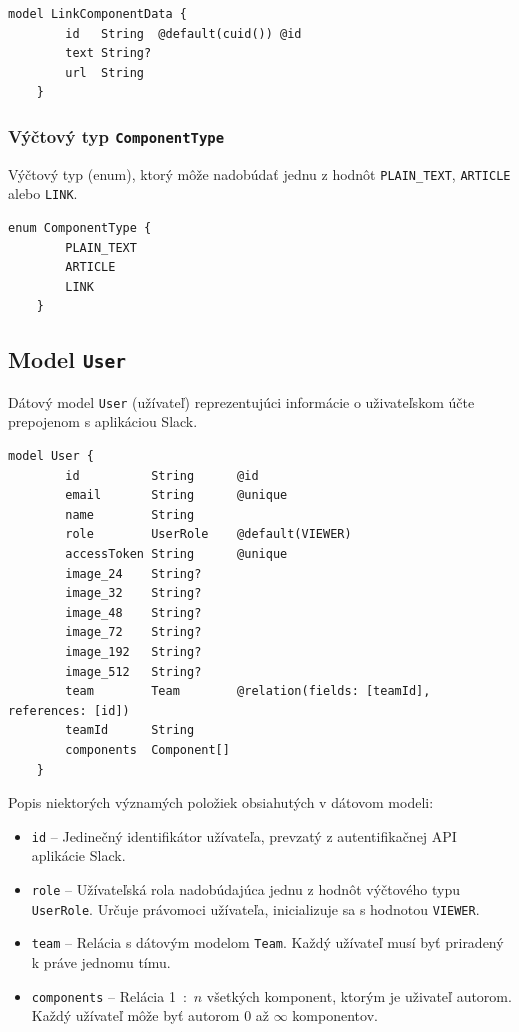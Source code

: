 \begin{lstlisting}[caption=Dátový model \texttt{LinkComponentData} v konfiguračnom súbore \texttt{prisma}.]
	model LinkComponentData {
		id   String  @default(cuid()) @id
		text String?
		url  String
	}
\end{lstlisting}

\subsubsection{Výčtový typ \texttt{ComponentType}}
Výčtový typ (enum), ktorý môže nadobúdať jednu z hodnôt \texttt{PLAIN\_TEXT}, \texttt{ARTICLE} alebo \texttt{LINK}. \\

\begin{lstlisting}[caption=Výčtový typ \texttt{ComponentType} v konfiguračnom súbore \texttt{prisma}.]
	enum ComponentType {
		PLAIN_TEXT
		ARTICLE
		LINK
	}
\end{lstlisting}

\subsection{Model \texttt{User}}
Dátový model \texttt{User} (užívateľ) reprezentujúci informácie o uživateľskom účte prepojenom s aplikáciou Slack. \\

\begin{lstlisting}[caption=Dátový model \texttt{User} v konfiguračnom súbore \texttt{prisma}.]
	model User {
		id          String      @id
		email       String      @unique
		name        String
		role        UserRole    @default(VIEWER)
		accessToken String      @unique
		image_24    String?
		image_32    String?
		image_48    String?
		image_72    String?
		image_192   String?
		image_512   String?
		team        Team        @relation(fields: [teamId], references: [id])
		teamId      String
		components  Component[]
	}
\end{lstlisting}

\bigskip

\noindent Popis niektorých významých položiek obsiahutých v dátovom modeli:

\begin{itemize}
	\item \texttt{id} -- Jedinečný identifikátor užívateľa, prevzatý z autentifikačnej API aplikácie Slack.
	\item \texttt{role} -- Užívateľská rola nadobúdajúca jednu z hodnôt výčtového typu \texttt{UserRole}. Určuje právomoci užívateľa, inicializuje sa s hodnotou \texttt{VIEWER}.
	\item \texttt{team} -- Relácia s dátovým modelom \texttt{Team}. Každý užívateľ musí byť priradený k práve jednomu tímu.
	\item \texttt{components} -- Relácia 1~:~$n$ všetkých komponent, ktorým je uživateľ autorom. Každý užívateľ môže byť autorom 0 až $\infty$ komponentov.
\end{itemize}

